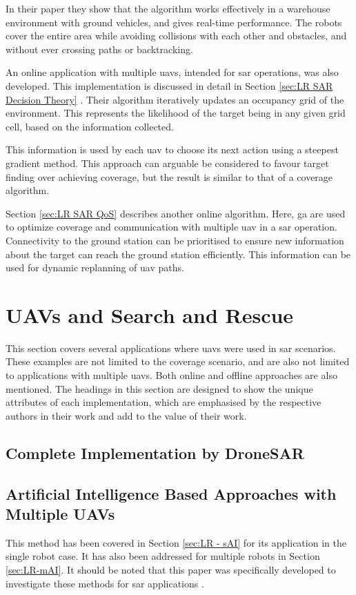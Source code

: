 In their paper they show that the algorithm works effectively in a warehouse environment with ground vehicles, and gives real-time performance. The robots cover the entire area while avoiding collisions with each other and obstacles, and without ever crossing paths or backtracking.

An online application with multiple \acp{uav}, intended for \acl{sar} operations, was also developed. This implementation is discussed in detail in Section \ref{sec:LR SAR Decision Theory} \cite{WaharteFINAL2010}. Their algorithm iteratively updates an occupancy grid of the environment. This represents the likelihood of the target being in any given grid cell, based on the information collected. 

This information is used by each \ac{uav} to choose its next action using a steepest gradient method. This approach can arguable be considered to favour target finding over achieving coverage, but the result is similar to that of a coverage algorithm. 

Section \ref{sec:LR SAR QoS} describes another online algorithm. Here, \acs{ga} are used to optimize coverage and communication with multiple \acs{uav} in a \ac{sar} operation. Connectivity to the ground station can be prioritised to ensure new information about the target can reach the ground station efficiently. This information can be used for dynamic replanning of \ac{uav} paths. \cite{Hayat2020}

\section{UAVs and Search and Rescue}
This section covers several applications where \acp{uav} were used in \ac{sar} scenarios. These examples are not limited to the coverage scenario, and are also not limited to applications with multiple \acp{uav}. Both online and offline approaches are also mentioned. The headings in this section are designed to show the unique attributes of each implementation, which are emphasised by the respective authors in their work and add to the value of their work.
\subsection{Complete Implementation by DroneSAR}
\subsection{Artificial Intelligence Based Approaches with Multiple UAVs}
\label{sec:LR-SAR-AI}
This method has been covered in Section \ref{sec:LR - sAI} for its application in the single robot case. It has also been addressed for multiple robots in Section \ref{sec:LR-mAI}. It should be noted that this paper was specifically developed to investigate these methods for \acl{sar} applications \cite{Juan2018}.

